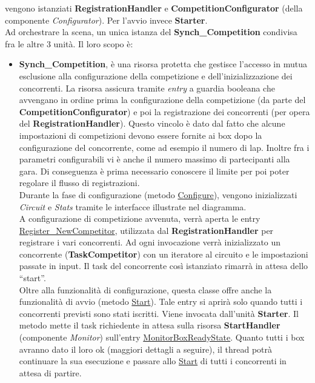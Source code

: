 vengono istanziati \textbf{RegistrationHandler} e \textbf{CompetitionConfigurator} (della componente \emph{Configurator}).
Per l'avvio invece \textbf{Starter}. \\
Ad orchestrare la scena, un unica istanza del \textbf{Synch\_Competition} condivisa fra le altre 3 unit\`{a}. Il loro scopo \`{e}:
\begin{itemize}
\item \textbf{Synch\_Competition}, \`{e} una risorsa protetta che gestisce l'accesso in mutua esclusione alla configurazione della competizione
e dell'inizializzazione dei concorrenti. La risorsa assicura tramite \emph{entry} a guardia booleana
che avvengano in ordine prima la configurazione
della competizione (da parte del \textbf{CompetitionConfigurator}) e poi la registrazione dei concorrenti (per opera del \textbf{RegistrationHandler}).
Questo vincolo \`{e} dato dal fatto che alcune impostazioni di competizioni devono essere fornite ai box dopo la configurazione del concorrente, 
come ad esempio il numero di lap. Inoltre fra i parametri configurabili vi \`{e} anche il numero massimo di partecipanti alla gara. Di conseguenza
\`{e} prima necessario conoscere il limite per poi poter regolare il flusso di registrazioni.\\
Durante la fase di configurazione (metodo \underline{Configure}), vengono inizializzati \emph{Circuit} e \emph{Stats} tramite le interfacce
illustrate nel diagramma.\\
A configurazione di competizione avvenuta, verr\`{a} aperta le entry\\ \underline{Register\_NewCompetitor}, utilizzata dal \textbf{RegistrationHandler}
per registrare i vari concorrenti. Ad ogni invocazione verr\`{a} inizializzato un concorrente (\textbf{TaskCompetitor}) con un iteratore al circuito
e le impostazioni passate in input. Il task del concorrente cos\`{i} istanziato rimarr\`{a} in attesa dello ``start''.\\
Oltre alla funzionalit\`{a} di configurazione, questa classe offre anche la funzionalit\`{a} di avvio (metodo \underline{Start}).
Tale entry si aprir\`{a} solo quando tutti i concorrenti previsti sono stati iscritti. Viene invocata dall'unit\`{a} \textbf{Starter}.
Il metodo mette il task richiedente in attesa sulla risorsa \textbf{StartHandler} (componente \emph{Monitor}) sull'entry \underline{MonitorBoxReadyState}.
Quanto tutti i box avranno dato il loro ok (maggiori dettagli a seguire), il thread potr\`{a} continuare la sua esecuzione e passare allo \underline{Start}
di tutti i concorrenti in attesa di partire.

\end{itemize}
